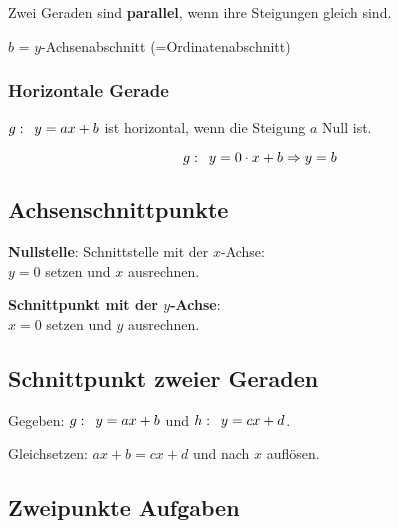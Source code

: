 \begin{multicols}{2}
Zwei Geraden sind \textbf{parallel}, wenn ihre Steigungen gleich sind.

$b$ = $y$-Achsenabschnitt (=Ordinatenabschnitt)
\forceCB
\headerUndFooterDieseSeite{}

\subsubsection*{Horizontale Gerade}

$g\-:\,\,\, y=ax+b$ ist horizontal, wenn die Steigung $a$ Null ist.

$$g\-:\,\,\,  y=0\cdot{}x+b \Rightarrow y=b$$



\subsection*{Achsenschnittpunkte}

\textbf{Nullstelle}: Schnittstelle mit der $x$-Achse:\\
$y=0$ setzen und $x$ ausrechnen.


\textbf{Schnittpunkt mit der $y$-Achse}:\\
$x=0$ setzen und $y$ ausrechnen.


\subsection*{Schnittpunkt zweier Geraden}
Gegeben: $g\-:\,\,\, y=ax+b$ und $h\-:\,\,\, y=cx+d$.

Gleichsetzen: $ax+b = cx+d$ und nach $x$ auflösen.






\subsection*{Zweipunkte Aufgaben}


\end{multicols}
